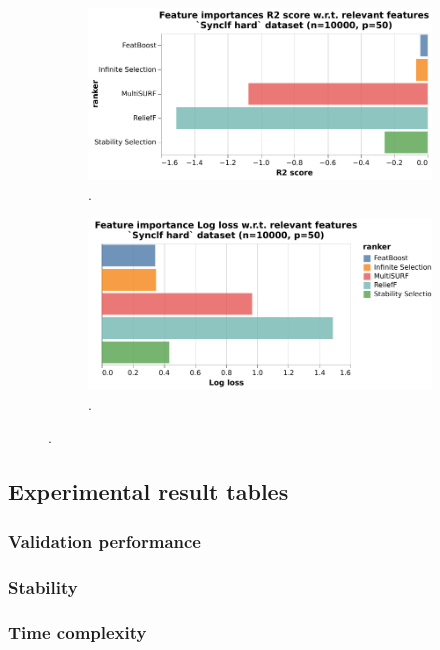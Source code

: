 \documentclass[../main.tex]{subfiles}
\begin{document}
\begin{figure}[ht]
     \centering
     \begin{subfigure}[b]{0.48\textwidth}
        \centering
        \includegraphics[width=\linewidth]{report/images/results-r2-score-various-rankers.pdf}
        \caption{.}
        \label{fig:results-r2-score-various-rankers}
     \end{subfigure}
     \hfill
     \begin{subfigure}[b]{0.48\textwidth}
        \centering
        \includegraphics[width=\linewidth]{report/images/results-log-loss-various-rankers.pdf}
        \caption{.}
        \label{fig:results-log-loss-various-rankers}
     \end{subfigure}
     
    \caption{.}
    \label{fig:results-ground-truth-various-rankers}
\end{figure}








\subsection{Experimental result tables}
\subsubsection{Validation performance}
\subsubsection{Stability}
\subsubsection{Time complexity}




\biblio
\end{document}

